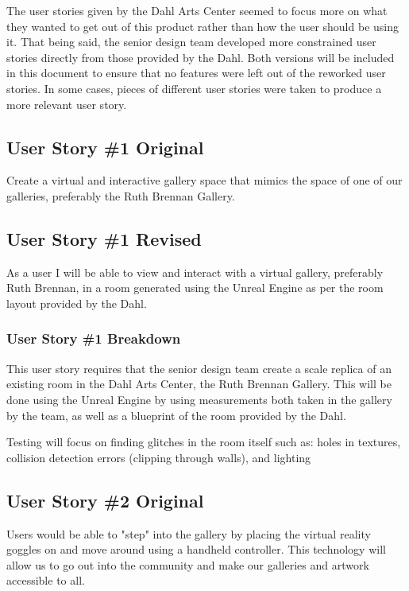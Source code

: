 The user stories given by the Dahl Arts Center seemed to focus more on what they wanted to get out of this product rather than how the user should be using it.  That being said, the senior design team developed more constrained user stories directly from those provided by the Dahl.  Both versions will be included in this document to ensure that no features were left out of the reworked user stories.  In some cases, pieces of different user stories were taken to produce a more relevant user story.



\subsection{User Story \#1 Original}
Create a virtual and interactive gallery space that mimics the space of one of our galleries, preferably the Ruth Brennan Gallery. 

\subsection{User Story \#1 Revised}
As a user I will be able to view and interact with a virtual gallery, preferably Ruth Brennan, in a room generated using the Unreal Engine as per the room layout provided by the Dahl.

\subsubsection{User Story \#1 Breakdown}
This user story requires that the senior design team create a scale replica of an existing room in the Dahl Arts Center, the Ruth Brennan Gallery.  This will be done using the Unreal Engine by using measurements both taken in the gallery by the team, as well as a blueprint of the room provided by the Dahl.  

Testing will focus on finding glitches in the room itself such as:  holes in textures, collision detection errors (clipping through walls), and lighting

\hrulefill

\subsection{User Story \#2 Original} 
Users would be able to "step" into the gallery by placing the virtual reality goggles on and move around using a handheld controller. This technology will allow us to go out into the community and make our galleries and artwork accessible to all. 

